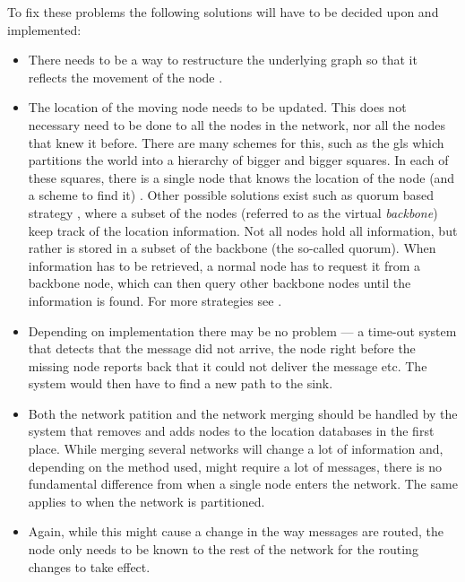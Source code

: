To fix these problems the following solutions will have to be decided upon and implemented:
\begin{itemize}
\item There needs to be a way to restructure the underlying graph so that it reflects the movement of the node \cite{practical}.
\item The location of the moving node needs to be updated. This does not necessary need to be done to all the nodes in the network, nor all the nodes that knew it before. There are many schemes for this, such as the \ac{gls} \cite{scaleLocation} which partitions the world into a hierarchy of bigger and bigger squares. In each of these squares, there is a single node that knows the location of the node (and a scheme to find it) \cite{scaleLocation}. Other possible solutions exist such as quorum based strategy \cite{quorum_basic}, where a subset of the nodes (referred to as the virtual \emph{backbone}) keep track of the location information. Not all nodes hold all information, but rather is stored in a subset of the backbone (the so-called quorum). When information has to be retrieved, a normal node has to request it from a backbone node, which can then query other backbone nodes until the information is found. For more strategies see \cite{surveyPosition}.
\item Depending on implementation there may be no problem --- a time-out system that detects that the message did not arrive, the node right before the missing node reports back that it could not deliver the message etc. The system would then have to find a new path to the sink.
\item Both the network patition and the network merging should be handled by the system that removes and adds nodes to the location databases in the first place. While merging several networks will change a lot of information and, depending on the method used, might require a lot of messages, there is no fundamental difference from when a single node enters the network. The same applies to when the network is partitioned. 
\item Again, while this might cause a change in the way messages are routed, the node only needs to be known to the rest of the network for the routing changes to take effect. 
\end{itemize}
